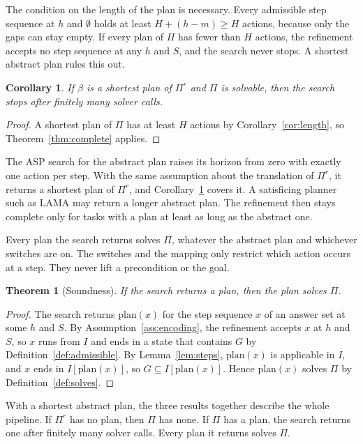 \documentclass{article}
\theoremstyle{definition}
\theoremstyle{plain}
\newtheorem{theorem}{Theorem}
\newtheorem{corollary}{Corollary}
\theoremstyle{definition}
\begin{document}
The condition on the length of the plan is necessary. Every admissible step sequence at $h$ and $\emptyset$ holds at least $H + (h - m) \geq H$ actions, because only the gaps can stay empty. If every plan of $\Pi$ has fewer than $H$ actions, the refinement accepts no step sequence at any $h$ and $S$, and the search never stops. A shortest abstract plan rules this out.

\begin{corollary}\label{cor:shortest}
If $\beta$ is a shortest plan of $\Pi^r$ and $\Pi$ is solvable, then the search stops after finitely many solver calls.
\end{corollary}

\begin{proof}
A shortest plan of $\Pi$ has at least $H$ actions by Corollary~\ref{cor:length}, so Theorem~\ref{thm:complete} applies.
\end{proof}

The ASP search for the abstract plan raises its horizon from zero with exactly one action per step. With the same assumption about the translation of $\Pi^r$, it returns a shortest plan of $\Pi^r$, and Corollary~\ref{cor:shortest} covers it. A satisficing planner such as LAMA may return a longer abstract plan. The refinement then stays complete only for tasks with a plan at least as long as the abstract one.

Every plan the search returns solves $\Pi$, whatever the abstract plan and whichever switches are on. The switches and the mapping only restrict which action occurs at a step. They never lift a precondition or the goal.

\begin{theorem}[Soundness]\label{thm:sound}
If the search returns a plan, then the plan solves $\Pi$.
\end{theorem}

\begin{proof}
The search returns $\mathrm{plan}(x)$ for the step sequence $x$ of an answer set at some $h$ and $S$. By Assumption~\ref{ass:encoding}, the refinement accepts $x$ at $h$ and $S$, so $x$ runs from $I$ and ends in a state that contains $G$ by Definition~\ref{def:admissible}. By Lemma~\ref{lem:steps}, $\mathrm{plan}(x)$ is applicable in $I$, and $x$ ends in $I[\mathrm{plan}(x)]$, so $G \subseteq I[\mathrm{plan}(x)]$. Hence $\mathrm{plan}(x)$ solves $\Pi$ by Definition~\ref{def:solves}.
\end{proof}

With a shortest abstract plan, the three results together describe the whole pipeline. If $\Pi^r$ has no plan, then $\Pi$ has none. If $\Pi$ has a plan, the search returns one after finitely many solver calls. Every plan it returns solves $\Pi$.
\end{document}
